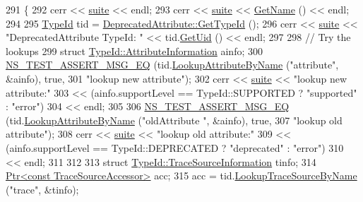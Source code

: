\begin{DoxyCode}
291 \{
292   cerr << \hyperlink{type-id-test-suite_8cc_ab4acb0fe33ca0947f675eed6196ed8ca}{suite} << endl;
293   cerr << \hyperlink{type-id-test-suite_8cc_ab4acb0fe33ca0947f675eed6196ed8ca}{suite} << \hyperlink{classns3_1_1TestCase_a28f7bb59669c24dae1c290fc17fc9b62}{GetName} () << endl;
294 
295   \hyperlink{classns3_1_1TypeId}{TypeId} tid = \hyperlink{classDeprecatedAttribute_a6288a8b7cf3b4b8ccc271c72d3241c9c}{DeprecatedAttribute::GetTypeId} ();
296   cerr << \hyperlink{type-id-test-suite_8cc_ab4acb0fe33ca0947f675eed6196ed8ca}{suite} << \textcolor{stringliteral}{"DeprecatedAttribute TypeId: "} << tid.\hyperlink{classns3_1_1TypeId_acd3e41de6340d06299f4fd63e2ed8da0}{GetUid} () << endl;
297   
298   \textcolor{comment}{//  Try the lookups}
299   \textcolor{keyword}{struct }\hyperlink{structns3_1_1TypeId_1_1AttributeInformation}{TypeId::AttributeInformation} ainfo;
300   \hyperlink{group__testing_ga2a9d78cffb3db8e867c35fff0b698cf5}{NS\_TEST\_ASSERT\_MSG\_EQ} (tid.\hyperlink{classns3_1_1TypeId_ac0a446957d516129937e2f2285aab58b}{LookupAttributeByName} (\textcolor{stringliteral}{"attribute"}, 
      &ainfo), \textcolor{keyword}{true},
301                       \textcolor{stringliteral}{"lookup new attribute"});
302   cerr << \hyperlink{type-id-test-suite_8cc_ab4acb0fe33ca0947f675eed6196ed8ca}{suite} << \textcolor{stringliteral}{"lookup new attribute:"}
303        << (ainfo.supportLevel == TypeId::SUPPORTED ? \textcolor{stringliteral}{"supported"} : \textcolor{stringliteral}{"error"})
304        << endl;
305 
306   \hyperlink{group__testing_ga2a9d78cffb3db8e867c35fff0b698cf5}{NS\_TEST\_ASSERT\_MSG\_EQ} (tid.\hyperlink{classns3_1_1TypeId_ac0a446957d516129937e2f2285aab58b}{LookupAttributeByName} (\textcolor{stringliteral}{"oldAttribute
      "}, &ainfo), \textcolor{keyword}{true},
307                       \textcolor{stringliteral}{"lookup old attribute"});
308   cerr << \hyperlink{type-id-test-suite_8cc_ab4acb0fe33ca0947f675eed6196ed8ca}{suite} << \textcolor{stringliteral}{"lookup old attribute:"}
309        << (ainfo.supportLevel == TypeId::DEPRECATED ? \textcolor{stringliteral}{"deprecated"} : \textcolor{stringliteral}{"error"})
310        << endl;
311 
312 
313   \textcolor{keyword}{struct }\hyperlink{structns3_1_1TypeId_1_1TraceSourceInformation}{TypeId::TraceSourceInformation} tinfo;
314   \hyperlink{classns3_1_1Ptr}{Ptr<const TraceSourceAccessor>} acc;
315   acc = tid.\hyperlink{classns3_1_1TypeId_a9b846d40a381142dc29f4dcd9b905c7f}{LookupTraceSourceByName} (\textcolor{stringliteral}{"trace"}, &tinfo);

\end{DoxyCode}

